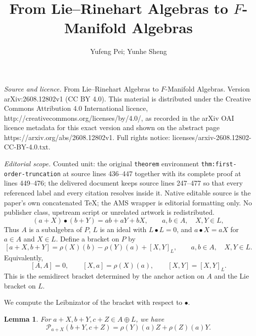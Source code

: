 \documentclass[10pt,a4paper]{amsart}
\newtheorem{lemma}[theorem]{Lemma}
\newcommand{\Pcal}{\mathcal P}
\begin{document}
\title[From Lie--Rinehart Algebras to F-Manifold Algebras]{From Lie--Rinehart Algebras to $F$-Manifold Algebras}
\author{Yufeng Pei; Yunhe Sheng}
\date{}
\maketitle
\noindent\emph{Source and licence.} From Lie--Rinehart Algebras to $F$-Manifold Algebras. Version arXiv:2608.12802v1 (CC BY 4.0). This material is distributed under the Creative Commons Attribution 4.0 International licence, http://creativecommons.org/licenses/by/4.0/, as recorded in the arXiv OAI licence metadata for this exact version and shown on the abstract page https://arxiv.org/abs/2608.12802v1. Full rights notice: licenses/arxiv-2608.12802-CC-BY-4.0.txt.\par\smallskip
\noindent\textit{Editorial scope.} Counted unit: the original \texttt{theorem} environment \texttt{thm:first-order-truncation} at source lines 436--447 together with its complete proof at lines 449--476; the delivered document keeps source lines 247--477 so that every referenced label and every citation resolves inside it. Native editable source is the paper's own concatenated TeX; the AMS wrapper is editorial formatting only. No publisher class, upstream script or unrelated artwork is redistributed.
	\begin{equation}\label{eq:F-product}
		(a+X)\bullet(b+Y)=ab+aY+bX,
		\qquad a,b\in A,\quad X,Y\in L,
	\end{equation}
	Thus $A$ is a subalgebra of $P$, $L$ is an ideal with
	$L\bullet L=0$, and $a\bullet X=aX$ for $a\in A$ and $X\in L$.
	Define a bracket on $P$ by
	\begin{equation}\label{eq:F-bracket}
		[a+X,b+Y]
		=\rho(X)(b)-\rho(Y)(a)+[X,Y]_L,
		\qquad a,b\in A,\quad X,Y\in L.
	\end{equation}
	Equivalently,
	\[
	[A,A]=0,
	\qquad
	[X,a]=\rho(X)(a),
	\qquad
	[X,Y]=[X,Y]_L.
	\]
	This is the semidirect bracket determined by the anchor action on \(A\) and
	the Lie bracket on \(L\).
	
	
	
	We compute the Leibnizator of the bracket with respect to $\bullet$.
	
	\begin{lemma}\label{lem:Leibnizator-formula}
		For $a+X, b+Y, c+Z\in A\oplus L$, we have
		\begin{equation}\label{eq:Leibnizator-formula}
			\Pcal_{a+X}(b+Y,c+Z)=\rho(Y)(a)Z+\rho(Z)(a)Y.
		\end{equation}
		
	\end{lemma}
	
\end{document}
